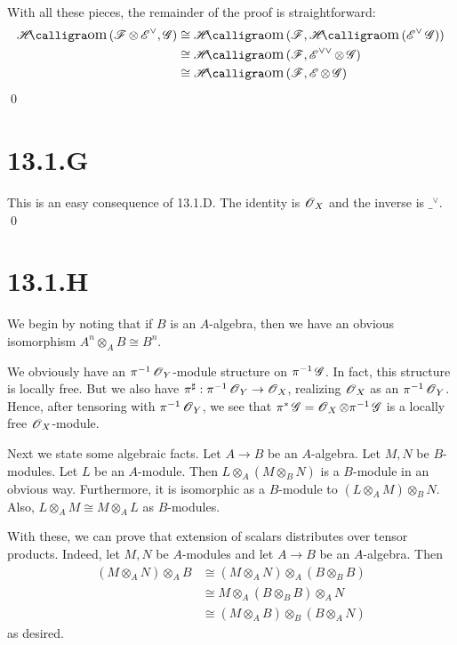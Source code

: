 \documentclass{article}
\begin{document}
With all these pieces, the remainder of the proof is straightforward:
\begin{align*}
    \Hom(\Fsh \otimes \Esh^\vee, \Gsh) & \cong \Hom(\Fsh, \Hom(\Esh^\vee \Gsh))         \\
                                       & \cong \Hom(\Fsh, \Esh^{\vee\vee} \otimes \Gsh) \\
                                       & \cong \Hom(\Fsh, \Esh \otimes \Gsh)
\end{align*}
\qed

\section{13.1.G}
This is an easy consequence of 13.1.D. The identity is $\operatorname{\mathscr{O}}_X$
and the inverse is $\_^\vee$. \qed

\section{13.1.H}
We begin by noting that if $B$ is an
$A$-algebra, then we have an obvious isomorphism
$A^n \otimes_A B \cong B^n$.

We obviously have an $\pi^{-1}\operatorname{\mathscr{O}}_Y$-module structure on
$\pi^{-1}\operatorname{\mathscr{G}}$. In fact, this structure is locally free. But we also
have $\pi^{\sharp}: \pi^{-1}\operatorname{\mathscr{O}}_Y \to \operatorname{\mathscr{O}}_X$, realizing $\operatorname{\mathscr{O}}_X$ as an
$\pi^{-1}\operatorname{\mathscr{O}}_Y$. Hence, after tensoring with $\pi^{-1}\operatorname{\mathscr{O}}_Y$,
we see that $\pi^*\operatorname{\mathscr{G}} = \operatorname{\mathscr{O}}_X \otimes \pi^{-1}\operatorname{\mathscr{G}}$ is a locally free
$\operatorname{\mathscr{O}}_X$-module.

Next we state some algebraic facts. Let $A \to B$ be an
$A$-algebra. Let $M, N$ be
$B$-modules. Let $L$ be an
$A$-module. Then $L \otimes_A (M \otimes_B N)$ is a
$B$-module in an obvious way. Furthermore, it is isomorphic
as a $B$-module to $(L \otimes_A M) \otimes_B N$. Also,
$L \otimes_A M \cong M \otimes_A L$ as $B$-modules.

With these, we can prove that extension of scalars distributes over tensor
products. Indeed, let $M, N$ be
$A$-modules and let $A\to B$ be an
$A$-algebra. Then
\begin{align*}
    (M \otimes_A N) \otimes_A B & \cong (M \otimes_A N) \otimes_A (B \otimes_B B) \\
                                & \cong M \otimes_A (B \otimes_B B) \otimes_A N   \\
                                & \cong (M \otimes_A B) \otimes_B (B \otimes_A N)
\end{align*}
as desired.
\end{document}

